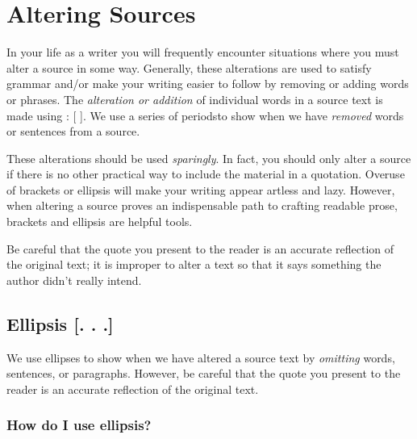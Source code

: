 
\chapter{Altering Sources}

In your life as a writer you will frequently encounter situations where you must
alter a source in some way. Generally, these alterations are used to satisfy
grammar and/or make your writing easier to follow by removing or adding words or
phrases. The \emph{alteration or addition} of individual words in a source text
is made using : [ ]. We use \textemdash a
series of periods\textemdash to show when we have \emph{removed} words or
sentences from a source.

These alterations should be used \emph{sparingly}. In fact, you should only
alter a source if there is no other practical way to include the material in a
quotation. Overuse of brackets or ellipsis will make your writing appear artless
and lazy. However, when altering a source proves an indispensable path to
crafting readable prose, brackets and ellipsis are helpful tools.

Be careful that the quote you present to the reader is an accurate reflection of
the original text; it is improper to alter a text so that it says something the
author didn’t really intend.

\hypertarget{ellipsis}{}
\section{Ellipsis [. . .]} We use ellipses to show when we have altered a source
text by \emph{omitting} words, sentences, or paragraphs. However, be careful
that the quote you present to the reader is an accurate reflection of the
original text.

\subsection{How do I use ellipsis?}

